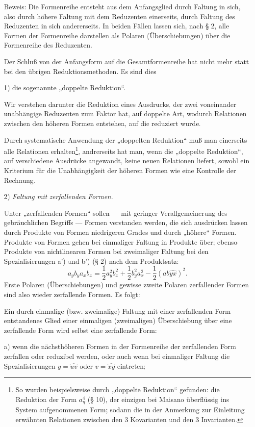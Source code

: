 \documentclass[11pt]{article}
\begin{document}
Beweis: Die Formenreihe entsteht aus dem Anfangsglied durch Faltung in sich, also durch höhere Faltung mit dem Reduzenten einerseits, durch Faltung des Reduzenten in sich andererseits. In beiden Fällen lassen sich, nach § 2, alle Formen der Formenreihe darstellen als Polaren (Überschiebungen) über die Formenreihe des Reduzenten.

Der Schluß von der Anfangsform auf die Gesamtformenreihe hat nicht mehr statt bei den übrigen Reduktionsmethoden. Es sind dies

1) die sogenannte „doppelte Reduktion“.

Wir verstehen darunter die Reduktion eines Ausdrucks, der zwei voneinander unabhängige Reduzenten zum Faktor hat, auf doppelte Art, wodurch Relationen zwischen den höheren Formen entstehen, auf die reduziert wurde.

Durch systematische Anwendung der „doppelten Reduktion“ muß man einerseits alle Relationen erhalten\footnote{So wurden beispielsweise durch „doppelte Reduktion“ gefunden: die Reduktion der Form $a_\eta^4$ (§ 10), der einzigen bei Maisano überflüssig ins System aufgenommenen Form; sodann die in der Anmerkung zur Einleitung erwähnten Relationen zwischen den 3 Kovarianten und den 3 Invarianten.}, andrerseits hat man, wenn die „doppelte Reduktion“, auf verschiedene Ausdrücke angewandt, keine neuen Relationen liefert, sowohl ein Kriterium für die Unabhängigkeit der höheren Formen wie eine Kontrolle der Rechnung.

2) \emph{Faltung mit zerfallenden Formen.}

Unter „zerfallenden Formen“ sollen --- mit geringer Verallgemeinerung des gebräuchlichen Begriffs --- Formen verstanden werden, die sich ausdrücken lassen durch Produkte von Formen niedrigeren Grades und durch „höhere“ Formen. Produkte von Formen gehen bei einmaliger Faltung in Produkte über; ebenso Produkte von nichtlinearen Formen bei zweimaliger Faltung bei den Spezialisierungen a') und b') (§ 2) nach dem Produktsatz:
\[
a_yb_y a_xb_x=\frac12a_y^2b_x^2+\frac12b_y^2a_x^2-\frac12(ab\widehat{yx})^2.
\]
Erste Polaren (Überschiebungen) und gewisse zweite Polaren zerfallender Formen sind also wieder zerfallende Formen. Es folgt:

Ein durch einmalige (bzw. zweimalige) Faltung mit einer zerfallenden Form entstandenes Glied einer einmaligen (zweimaligen) Überschiebung über eine zerfallende Form wird selbst eine zerfallende Form:

a) wenn die nächsthöheren Formen in der Formenreihe der zerfallenden Form zerfallen oder reduzibel werden, oder auch wenn bei einmaliger Faltung die Spezialisierungen $y=\widehat{uv}$ oder $v=\widehat{xy}$ eintreten;
\end{document}
